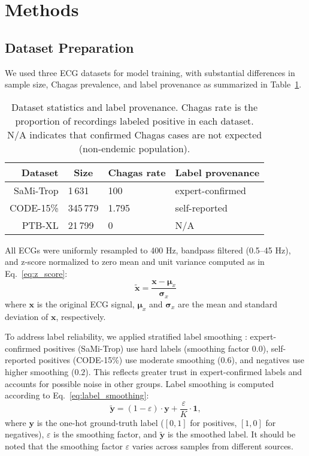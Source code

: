 \section{Methods}
\label{sec:methods}


\subsection{Dataset Preparation}
\label{subsec:data}


We used three ECG datasets for model training, with substantial differences in sample size, Chagas prevalence, and label provenance as summarized in Table~\ref{tab:dataset_stats}.

\begin{table}[!htp]
\centering
\begin{tabular}{rlll}
\toprule
Dataset & \multicolumn{1}{c}{Size} & \multicolumn{1}{c}{Chagas rate} & Label provenance \\
\midrule
SaMi-Trop & 1\,631   & 100 & expert-confirmed \\
CODE-15\% & 345\,779 & 1.795   & self-reported \\
PTB-XL    & 21\,799  & 0   & N/A \\
\bottomrule
\end{tabular}
\caption{Dataset statistics and label provenance. Chagas rate is the proportion of recordings labeled positive in each dataset. N/A indicates that confirmed Chagas cases are not expected (non-endemic population).}
\label{tab:dataset_stats}
\end{table}

All ECGs were uniformly resampled to 400 Hz, bandpass filtered (0.5–45 Hz), and z-score normalized to zero mean and unit variance computed as in Eq.~\ref{eq:z_score}:
\begin{equation}
\label{eq:z_score}
\tilde{\mathbf{x}} = \frac{\mathbf{x} - \boldsymbol{\mu}_x}{\boldsymbol{\sigma}_x}
\end{equation}
where $\mathbf{x}$ is the original ECG signal, $\boldsymbol{\mu}_x$ and $\boldsymbol{\sigma}_x$ are the mean and standard deviation of $\mathbf{x}$, respectively.

To address label reliability, we applied stratified label smoothing \cite{inceptionv2v3}: expert-confirmed positives (SaMi-Trop) use hard labels (smoothing factor $0.0$), self-reported positives (CODE-15\%) use moderate smoothing ($0.6$), and negatives use higher smoothing ($0.2$). This reflects greater trust in expert-confirmed labels and accounts for possible noise in other groups. Label smoothing is computed according to Eq.~\ref{eq:label_smoothing}:
\begin{equation}
\label{eq:label_smoothing}
\tilde{\mathbf{y}} = (1 - \varepsilon) \cdot \mathbf{y} + \frac{\varepsilon}{K} \cdot \mathbf{1},
\end{equation}
where $\mathbf{y}$ is the one-hot ground-truth label ($[0, 1]$ for positives, $[1, 0]$ for negatives), $\varepsilon$ is the smoothing factor, and $\tilde{\mathbf{y}}$ is the smoothed label. It should be noted that the smoothing factor $\varepsilon$ varies across samples from different sources.

